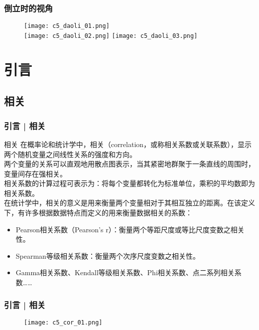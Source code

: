 \begin{frame}
  \frametitle{倒立时的视角}
  \begin{figure}
    \centering
    \texttt{[image: c5\_daoli\_01.png]}\\
    \texttt{[image: c5\_daoli\_02.png]}
    \texttt{[image: c5\_daoli\_03.png]}
  \end{figure}
\end{frame}

\section{引言}
\subsection{相关}
\begin{frame}
  \frametitle{引言 | 相关}
  \begin{block}{相关}
在概率论和统计学中，相关（correlation，或称相关系数或关联系数），显示两个随机变量之间线性关系的强度和方向。\\
\vspace{0.5em}
两个变量的关系可以直观地用散点图表示，当其紧密地群聚于一条直线的周围时，变量间存在强相关。\\
\vspace{0.5em}
相关系数的计算过程可表示为：将每个变量都转化为标准单位，乘积的平均数即为相关系数。\\
\vspace{0.5em}
在统计学中，相关的意义是用来衡量两个变量相对于其相互独立的距离。在该定义下，有许多根据数据特点而定义的用来衡量数据相关的系数：
\begin{itemize}
  \item Pearson相关系数（Pearson's r）：衡量两个等距尺度或等比尺度变数之相关性。
  \item Spearman等级相关系数：衡量两个次序尺度变数之相关性。
  \item Gamma相关系数、Kendall等级相关系数、Phi相关系数、点二系列相关系数……
\end{itemize}
  \end{block}
\end{frame}

\begin{frame}
  \frametitle{引言 | 相关}
  \begin{figure}
    \centering
    \texttt{[image: c5\_cor\_01.png]}
  \end{figure}
\end{frame}

